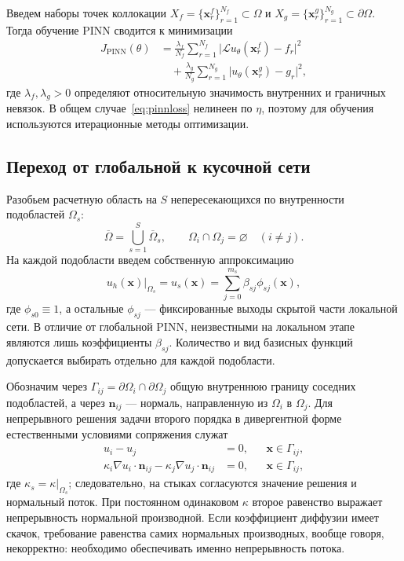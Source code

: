 \documentclass{misisarticle}
\begin{document}
Введем наборы точек коллокации $X_f=\{\mathbf{x}_r^f\}_{r=1}^{N_f}\subset\Omega$ и $X_g=\{\mathbf{x}_r^g\}_{r=1}^{N_g}\subset\partial\Omega$. Тогда обучение PINN сводится к минимизации
\begin{equation}
\begin{aligned}
 J_{\mathrm{PINN}}(\theta)
 &=\frac{\lambda_f}{N_f}\sum_{r=1}^{N_f}
 \bigl|\mathcal{L}u_\theta(\mathbf{x}_r^f)-f_r\bigr|^2\\
 &\quad+\frac{\lambda_g}{N_g}\sum_{r=1}^{N_g}
 \bigl|u_\theta(\mathbf{x}_r^g)-g_r\bigr|^2,
\end{aligned}
\label{eq:pinnloss}
\end{equation}
где $\lambda_f,\lambda_g>0$ определяют относительную значимость внутренних и граничных невязок. В общем случае~\eqref{eq:pinnloss} нелинеен по $\eta$, поэтому для обучения используются итерационные методы оптимизации.

\subsection{Переход от глобальной к кусочной сети}

Разобьем расчетную область на $S$ непересекающихся по внутренности подобластей $\Omega_s$:
\begin{equation}
 \overline{\Omega}=\bigcup_{s=1}^{S}\overline{\Omega}_s,
 \qquad \Omega_i\cap\Omega_j=\varnothing\quad(i\ne j).
\label{eq:domain}
\end{equation}
На каждой подобласти введем собственную аппроксимацию
\begin{equation}
 u_h(\mathbf{x})\big|_{\Omega_s}=u_s(\mathbf{x})=
 \sum_{j=0}^{m_s}\beta_{sj}\phi_{sj}(\mathbf{x}),
\label{eq:localnet}
\end{equation}
где $\phi_{s0}\equiv1$, а остальные $\phi_{sj}$ --- фиксированные выходы скрытой части локальной сети. В отличие от глобальной PINN, неизвестными на локальном этапе являются лишь коэффициенты $\beta_{sj}$. Количество и вид базисных функций допускается выбирать отдельно для каждой подобласти.

Обозначим через $\Gamma_{ij}=\partial\Omega_i\cap\partial\Omega_j$ общую внутреннюю границу соседних подобластей, а через $\mathbf n_{ij}$ --- нормаль, направленную из $\Omega_i$ в $\Omega_j$. Для непрерывного решения задачи второго порядка в дивергентной форме естественными условиями сопряжения служат
\begin{equation}
\begin{aligned}
 u_i-u_j&=0, && \mathbf{x}\in\Gamma_{ij},\\
 \kappa_i\nabla u_i\cdot\mathbf n_{ij}
 -\kappa_j\nabla u_j\cdot\mathbf n_{ij}&=0,
 && \mathbf{x}\in\Gamma_{ij},
\end{aligned}
\label{eq:interfaces}
\end{equation}
где $\kappa_s=\kappa|_{\Omega_s}$; следовательно, на стыках согласуются значение решения и нормальный поток. При постоянном одинаковом $\kappa$ второе равенство выражает непрерывность нормальной производной. Если коэффициент диффузии имеет скачок, требование равенства самих нормальных производных, вообще говоря, некорректно: необходимо обеспечивать именно непрерывность потока.
\end{document}
